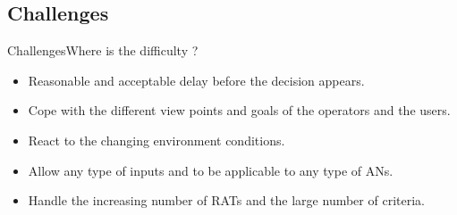 \subsection*{Challenges}
\begin{frame}[bg]{Challenges}{Where is the difficulty ?}
\begin{itemize}
	\item Reasonable and acceptable delay before the decision appears.
	\item Cope with the different view points and goals of the operators and the users.
	\item React to the changing environment conditions.
	\item Allow any type of inputs and to be applicable to any type of ANs.
	\item Handle the increasing number of RATs and the large number of criteria.
\end{itemize}

\end{frame}




